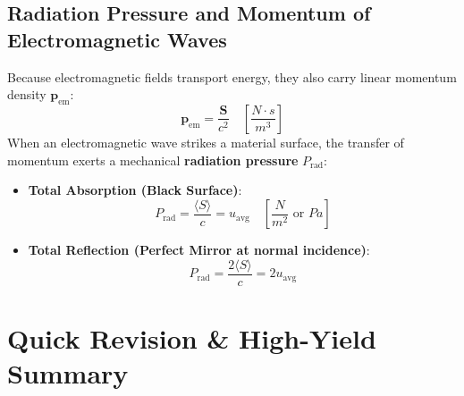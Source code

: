 \subsection{Radiation Pressure and Momentum of Electromagnetic Waves}
Because electromagnetic fields transport energy, they also carry linear momentum density $\mathbf{p}_{\text{em}}$:
\begin{equation}
    \mathbf{p}_{\text{em}} = \frac{\mathbf{S}}{c^2} \quad \left[\si{\frac{N\cdot s}{m^3}}\right]
\end{equation}
When an electromagnetic wave strikes a material surface, the transfer of momentum exerts a mechanical \textbf{radiation pressure} $P_{\text{rad}}$:
\begin{itemize}
    \item \textbf{Total Absorption (Black Surface)}:
    \begin{equation}
        P_{\text{rad}} = \frac{\langle S \rangle}{c} = u_{\text{avg}} \quad \left[\si{\frac{N}{m^2}} \text{ or } \si{Pa}\right]
    \end{equation}
    \item \textbf{Total Reflection (Perfect Mirror at normal incidence)}:
    \begin{equation}
        P_{\text{rad}} = \frac{2\langle S \rangle}{c} = 2 u_{\text{avg}}
    \end{equation}
\end{itemize}

\section{Quick Revision \& High-Yield Summary}

